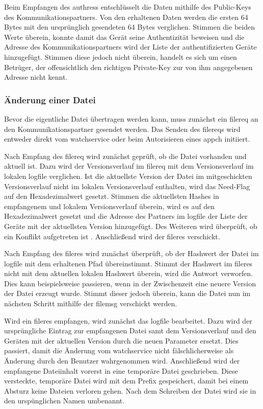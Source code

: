Beim Empfangen des \gls{authres}s entschlüsselt \sblit die Daten mithilfe des Public-Keys des Kommunikationspartners. Von den erhaltenen Daten werden die ersten 64 Bytes mit den ursprünglich gesendeten 64 Bytes verglichen. Stimmen die beiden Werte überein, konnte damit das Gerät seine Authentizität beweisen und die Adresse des Kommunikationspartners wird der Liste der authentifizierten Geräte hinzugefügt. Stimmen diese jedoch nicht überein, handelt es sich um einen Betrüger, der offensichtlich den richtigen Private-Key zur von ihm angegebenen Adresse nicht kennt.

\subsubsection{Änderung einer Datei}
Bevor die eigentliche Datei übertragen werden kann, muss zunächst ein \gls{filereq} an den Kommunikationspartner gesendet werden. Das Senden des \gls{filereq}s wird entweder direkt vom \gls{watchservice} oder beim Autorisieren eines \gls{appch} initiiert.

Nach Empfang des \gls{filereq} wird zunächst geprüft, ob die Datei vorhanden und aktuell ist. Dazu wird der Versionsverlauf im \gls{filereq} mit dem Versionsverlauf im lokalen \gls{logfile} verglichen. Ist die aktuellste Version der Datei im mitgeschickten Versionsverlauf nicht im lokalen Versionsverlauf enthalten, wird das Need-Flag auf den Hexadezimalwert  gesetzt. Stimmen die aktuellsten Hashes in empfangenem und lokalem Versionsverlauf überein, wird es auf den Hexadezimalwert  gesetzt und die Adresse des Partners im \gls{logfile} der Liste der Geräte mit der aktuellsten Version hinzugefügt. Des Weiteren wird überprüft, ob ein Konflikt aufgetreten ist . Anschließend wird der \gls{fileres} verschickt.

Nach Empfang des \gls{fileres} wird zunächst überprüft, ob der Hashwert der Datei im \gls{logfile} mit dem erhaltenen Pfad übereinstimmt. Stimmt der Hashwert im \gls{fileres} nicht mit dem aktuellen lokalen Hashwert überein, wird die Antwort verworfen. Dies kann beispielsweise passieren, wenn in der Zwischenzeit eine neuere Version der Datei erzeugt wurde. Stimmt dieser jedoch überein, kann die Datei nun im nächsten Schritt mithilfe der \gls{filemsg} verschickt werden.

Wird ein \gls{fileres} empfangen, wird zunächst das \gls{logfile} bearbeitet. Dazu wird der ursprüngliche Eintrag zur empfangenen Datei samt dem Versionsverlauf und den Geräten mit der aktuellen Version durch die neuen Parameter ersetzt. Dies passiert, damit die Änderung vom \gls{watchservice} nicht fälschlicherweise als Änderung durch den Benutzer wahrgenommen wird. Anschließend wird der empfangene Dateiinhalt vorerst in eine temporäre Datei geschrieben. Diese versteckte, temporäre Datei wird mit dem Prefix  gespeichert, damit bei einem Absturz keine Dateien verloren gehen. Nach dem Schreiben der Datei wird sie in den urspünglichen Namen umbenannt.

